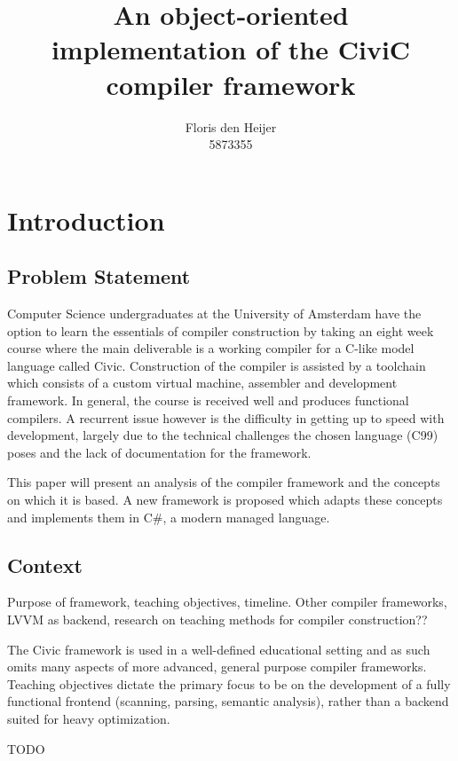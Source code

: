 \documentclass[twoside,openright]{uva-bachelor-thesis}
\title{An object-oriented \\implementation of the CiviC compiler framework}
\author{Floris den Heijer\\5873355}
\begin{document}
\maketitle
\begin{abstract}
	\lipsum
\end{abstract}

\tableofcontents


\chapter{Introduction}
	
	\section{Problem Statement}
		Computer Science undergraduates at the University of Amsterdam have the option to learn the essentials of compiler construction by taking an eight week course where the main deliverable is a working compiler for a C-like model language called Civic. Construction of the compiler is assisted by a toolchain which consists of a custom virtual machine, assembler and development framework. In general, the course is received well and produces functional compilers. A recurrent issue however is the difficulty in getting up to speed with development, largely due to the technical challenges the chosen language (C99) poses and the lack of documentation for the framework.
		
		This paper will present an analysis of the compiler framework and the concepts on which it is based. A new framework is proposed which adapts these concepts and implements them in C\#, a modern managed language.
			
	\section{Context}
		Purpose of framework, teaching objectives, timeline.
		Other compiler frameworks, LVVM as backend, research on teaching methods for compiler construction??
		
		The Civic framework is used in a well-defined educational setting and as such omits many aspects of more advanced, general purpose compiler frameworks. Teaching objectives dictate the primary focus to be on the development of a fully functional frontend (scanning, parsing, semantic analysis), rather than a backend suited for heavy optimization.
		
		TODO
	
\end{document}
